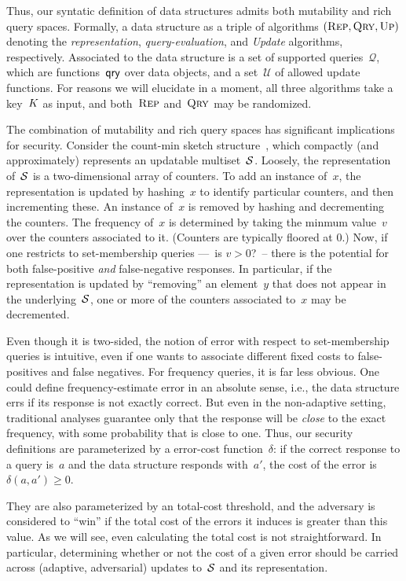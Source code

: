 Thus, our syntatic definition of data structures admits both
mutability and rich query spaces.
Formally, a data structure as a triple of algorithms $(\textnormal{\textsc{Rep}}, \textnormal{\textsc{Qry}}, \textnormal{\textsc{Up}})$ denoting
the \emph{representation}, \emph{query-evaluation}, and \emph{Update} algorithms, respectively.
Associated to the data structure is a set of supported
queries~$\mathcal{Q}$, which are functions~$\mathsf{qry}$ over data objects,
and a set~$\mathcal{U}$ of allowed update functions.
For reasons we will elucidate in a moment, all three algorithms take a
key~$K$ as input, and both~$\textnormal{\textsc{Rep}}$ and~$\textnormal{\textsc{Qry}}$ may be randomized.


The combination of mutability and rich query spaces has significant
implications for security.  Consider the count-min
sketch structure~\cite{xxx}, which compactly (and approximately)
represents an updatable multiset~$\mathcal{S}$.  
Loosely, the representation of~$\mathcal{S}$ is a two-dimensional array
of counters. To add an instance of~$x$, the representation is
updated by hashing~$x$ to identify particular counters, and then
incrementing these.  An instance of~$x$ is removed
by hashing and decrementing the counters.  
The frequency of~$x$ is determined by taking
the minmum value~$v$ over the counters associated to it. (Counters are
typically floored at 0.)  Now, if one
restricts to set-membership queries ---~is $v>0$?~-- there is the
potential for both false-positive \emph{and} false-negative
responses.  In particular, if the representation is updated by
``removing'' an element~$y$ that does not appear in the
underlying~$\mathcal{S}$, one or more of the counters associated to~$x$ may
be decremented.  

Even though it is two-sided, the notion of error with respect to set-membership
queries is intuitive, even if one wants to associate different
fixed costs to false-positives and false negatives.  For frequency
queries, it is far less obvious.   One could define frequency-estimate
error in an absolute sense, i.e., the data structure errs if its
response is not exactly correct.  But even in the non-adaptive
setting, traditional analyses guarantee only that the response will be
\emph{close} to the exact frequency, with some probability that is close
to one.  Thus, our security definitions are parameterized by a
error-cost function~$\delta$: if the correct response to a query is~$a$ and
the data structure responds with~$a'$, the cost of the error is
$\delta(a,a') \geq 0$.  

They are also parameterized by an total-cost threshold, and
the adversary is considered to ``win'' if the total cost of the errors it induces
is greater than this value.  As we will see, even calculating the
total cost is not straightforward.  In particular, determining whether
or not the cost of a given error should be carried across (adaptive,
adversarial) updates to~$\mathcal{S}$ and its representation.

